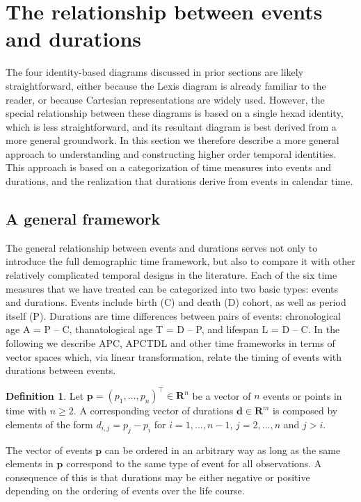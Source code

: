 \documentclass[12pt,oneside,a4paper]{article} %
\theoremstyle{definition}
\newtheorem{definition}{Definition}[section]
\begin{document}
\FloatBarrier

\section{The relationship between events and durations}
\label{sec:gen}
The four identity-based diagrams discussed in prior sections are likely
straightforward, either because the Lexis diagram is already
familiar to the reader, or because Cartesian representations are widely used.
However, the special relationship between these diagrams is based on a single
hexad identity, which is less straightforward, and its resultant
diagram is best derived from a more general groundwork. In this section we therefore describe a more general
approach to understanding and constructing higher order temporal identities.
This approach is based on a categorization of time measures into events and
durations, and the realization that durations derive from events in calendar
time.

\subsection{A general framework}
\label{sec:framework}

The general relationship between events and durations serves not only to
introduce the full demographic time framework, but also to compare it with
other relatively complicated temporal designs in the literature. Each of the six
time measures that we have treated can be categorized into two basic types:
events and durations. Events include birth (C) and death (D) cohort, as well as period
itself (P). Durations are time differences between pairs of events: chronological age A = P -- C, 
thanatological age T = D -- P, and lifespan L = D -- C. In the following we
describe APC, APCTDL and other time frameworks in terms of vector spaces which, via linear transformation, relate the timing of events with durations between events.

\begin{definition} 
  Let $\boldsymbol{p}=(p_1,\ldots,p_n)^\top\in\mathbf{R}^n$ be a vector of $n$
  events or points in time with $n\geq2$. A corresponding vector of durations $\boldsymbol{d}\in\mathbf{R}^m$ is composed by elements of the form $d_{i,j}=p_j-p_i$ for $i=1,\dots,n-1$, $j=2,\dots,n$ and $j>i$.
  \label{def:1}
\end{definition}

The vector of events $\boldsymbol{p}$ can be ordered in an arbitrary way as long as the same elements in $\boldsymbol{p}$ correspond to the same type of event for all observations. A consequence of this is that durations may be either
negative or positive depending on the ordering of events over the life course.
\end{document}
